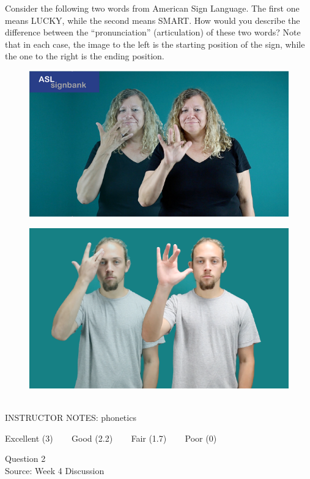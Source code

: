 \documentclass[12pt]{article}
\begin{document}
Consider the following two words from American Sign Language. The first one means LUCKY, while the second means SMART. How would you describe the difference between the ``pronunciation'' (articulation) of these two words? Note that in each case, the image to the left is the starting position of the sign, while the one to the right is the ending position.

\begin{figure}[H]
\includegraphics{../images/asl_lucky.png}
\end{figure}
\begin{figure}[H]
\includegraphics{../images/asl_smart.png}
\end{figure}

~\\
INSTRUCTOR NOTES: phonetics


\vfill
Excellent (3) ~~~ Good (2.2) ~~~ Fair (1.7) ~~~ Poor (0)
\newpage

{\large Question 2}\\

Source: Week 4 Discussion\\
\end{document}

